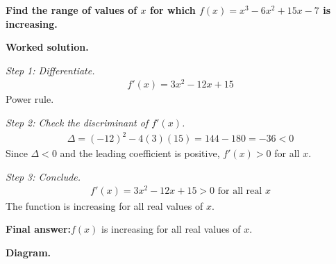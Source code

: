 \documentclass[11pt]{article}
\newcommand{\question}[1]{\par\medskip\noindent\textbf{#1}\par}
\begin{document}
\question{Find the range of values of \( x \) for which \( f(x) = x^3 - 6x^2 + 15x - 7 \) is increasing.}

\textbf{Worked solution.}

\textit{Step 1: Differentiate.}
\[\begin{gathered}
f'(x) = 3x^2 - 12x + 15
\end{gathered}\]
Power rule.

\textit{Step 2: Check the discriminant of \( f'(x) \).}
\[\begin{gathered}
\Delta = (-12)^2 - 4(3)(15) = 144 - 180 = -36 < 0
\end{gathered}\]
Since \( \Delta < 0 \) and the leading coefficient is positive, \( f'(x) > 0 \) for all \( x \).

\textit{Step 3: Conclude.}
\[\begin{gathered}
f'(x) = 3x^2 - 12x + 15 > 0 \text{ for all real } x
\end{gathered}\]
The function is increasing for all real values of \( x \).

\begin{answerbox}
\textbf{Final answer:}\quad \(\displaystyle  f(x) \) is increasing for all real values of \(\displaystyle  x \).
\end{answerbox}
\textbf{Diagram.}
\end{document}
